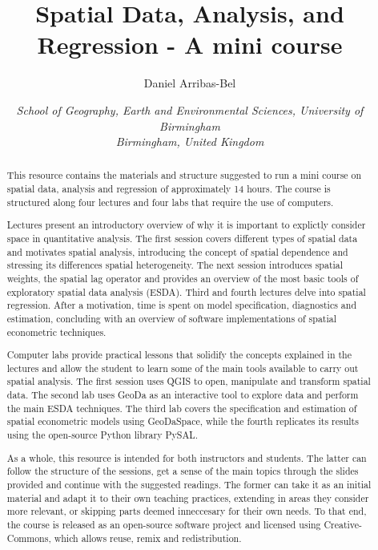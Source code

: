 \documentclass[12pt, a4paper]{article}
\begin{document}
\renewcommand{\baselinestretch}{1}
\title{\bfseries Spatial Data, Analysis, and Regression - A mini course } 
\bigskip
\author{Daniel Arribas-Bel \bigskip 
\and 
{\small { \emph{School of Geography, Earth and Environmental Sciences,
University of Birmingham}}}  \\
{\small  {\emph{Birmingham, United Kingdom}}}  \\
\bigskip}
\date{}
\maketitle

\begin{abstract}
    
This resource contains the materials and structure suggested to run a mini
course on spatial data, analysis and regression of approximately 14 hours. The
course is structured along four lectures and four labs that require the use of
computers.

Lectures present an introductory overview of why it is important to explictly
consider space in quantitative analysis. The first session covers different
types of spatial data and motivates spatial analysis, introducing the concept
of spatial dependence and stressing its differences spatial heterogeneity. The
next session introduces spatial weights, the spatial lag operator and provides
an overview of the most basic tools of exploratory spatial data analysis
(ESDA). Third and fourth lectures delve into spatial regression. After a
motivation, time is spent on model specification, diagnostics and estimation,
concluding with an overview of software implementations of spatial econometric
techniques.

Computer labs provide practical lessons that solidify the concepts explained
in the lectures and allow the student to learn some of the main tools
available to carry out spatial analysis. The first session uses QGIS to open,
manipulate and transform spatial data. The second lab uses GeoDa as an
interactive tool to explore data and perform the main ESDA techniques. The
third lab covers the specification and estimation of spatial econometric
models using GeoDaSpace, while the fourth replicates its results using the
open-source Python library PySAL.

As a whole, this resource is intended for both instructors and students. The
latter can follow the structure of the sessions, get a sense of the main
topics through the slides provided and continue with the suggested readings.
The former can take it as an initial material and adapt it to their own
teaching practices, extending in areas they consider more relevant, or
skipping parts deemed inneccesary for their own needs. To that end, the course
is released as an open-source software project and licensed using
Creative-Commons, which allows reuse, remix and redistribution.


\end{abstract}
\end{document}
